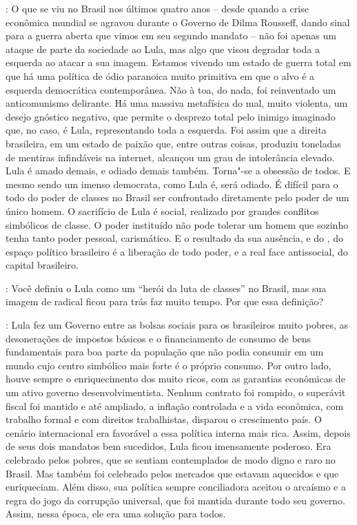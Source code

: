 \noindent{}: O que se viu no Brasil nos últimos quatro anos -- desde quando a crise
econômica mundial se agravou durante o Governo de Dilma Rousseff, dando
sinal para a guerra aberta que vimos em seu segundo mandato -- não foi
apenas um ataque de parte da sociedade ao Lula, mas algo que visou
degradar toda a esquerda ao atacar a sua imagem. Estamos vivendo um
estado de guerra total em que há uma política de ódio paranoica muito
primitiva em que o alvo é a esquerda democrática contemporânea. Não à
toa, do nada, foi reinventado um anticomunismo delirante. Há uma massiva
metafísica do mal, muito violenta, um desejo gnóstico negativo, que
permite o desprezo total pelo inimigo imaginado que, no caso, é Lula,
representando toda a esquerda. Foi assim que a direita brasileira, em um
estado de paixão que, entre outras coisas, produziu toneladas de
mentiras infindáveis na internet, alcançou um grau de intolerância
elevado. Lula é amado demais, e odiado demais também. Torna"-se a
obsessão de todos. E mesmo sendo um imenso democrata, como Lula é, será
odiado. É difícil para o todo do poder de classes no Brasil ser
confrontado diretamente pelo poder de um único homem. O sacrifício de
Lula é social, realizado por grandes conflitos simbólicos de classe. O
poder instituído não pode tolerar um homem que sozinho tenha tanto poder
pessoal, carismático. E o resultado da sua ausência, e do , do espaço
político brasileiro é a liberação de todo poder, e a real face
antissocial, do capital brasileiro.

\smallskip

\noindent{}: Você definiu o Lula como um ``herói da luta de classes'' no Brasil, mas
sua imagem de radical ficou para trás faz muito tempo. Por que essa
definição?

\noindent{}: Lula fez um Governo entre as bolsas sociais para os brasileiros muito
pobres, as desonerações de impostos básicos e o financiamento de consumo
de bens fundamentais para boa parte da população que não podia consumir
em um mundo cujo centro simbólico mais forte é o próprio consumo. Por
outro lado, houve sempre o enriquecimento dos muito ricos, com as
garantias econômicas de um ativo governo desenvolvimentista. Nenhum
contrato foi rompido, o superávit fiscal foi mantido e até ampliado, a
inflação controlada e a vida econômica, com trabalho formal e com
direitos trabalhistas, disparou o crescimento país. O cenário
internacional era favorável a essa política interna mais rica. Assim,
depois de seus dois mandatos bem sucedidos, Lula ficou imensamente
poderoso. Era celebrado pelos pobres, que se sentiam contemplados de
modo digno e raro no Brasil. Mas também foi celebrado pelos mercados que
estavam aquecidos e que enriqueciam. Além disso, sua política sempre
conciliadora aceitou o arcaísmo e a regra do jogo da corrupção
universal, que foi mantida durante todo seu governo. Assim, nessa época,
ele era uma solução para todos.

